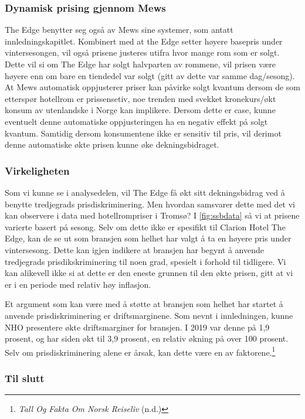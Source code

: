 \documentclass[
  12pt,
  a4paper,
  DIV=11,
  numbers=noendperiod]{scrartcl}
\begin{document}
\subsubsection{Dynamisk prising gjennom
Mews}\label{dynamisk-prising-gjennom-mews}

The Edge benytter seg også av Mews sine systemer, som antatt
innledningskapitlet. Kombinert med at the Edge setter høyere basepris
under vintersesongen, vil også prisene justeres utifra hvor mange rom
som er solgt. Dette vil si om The Edge har solgt halvparten av rommene,
vil prisen være høyere enn om bare en tiendedel var solgt (gitt av dette
var samme dag/sesong). At Mews automatisk oppjusterer priser kan påvirke
solgt kvantum dersom de som etterspør hotellrom er prissensetiv, noe
trenden med svekket kronekurs/økt konsum av utenlandske i Norge kan
implikere. Dersom dette er case, kunne eventuelt denne automatiske
oppjusteringen ha en negativ effekt på solgt kvantum. Samtidig dersom
konsumentene ikke er sensitiv til pris, vil derimot denne automatiske
økte prisen kunne øke dekningsbidraget.

\subsubsection{Virkeligheten}\label{virkeligheten}

Som vi kunne se i analysedelen, vil The Edge få økt sitt dekningsbidrag
ved å benytte tredjegrads prisdiskriminering. Men hvordan samsvarer
dette med det vi kan observere i data med hotellrompriser i Tromsø? I
\autoref{fig:ssbdata} så vi at prisene varierte basert på sesong. Selv
om dette ikke er spesifikt til Clarion Hotel The Edge, kan de se ut som
bransjen som helhet har valgt å ta en høyere pris under vintersesong.
Dette kan igjen indikere at bransjen har begynt å anvende tredjegrads
prisdikskriminering til noen grad, spesielt i forhold til tidligere. Vi
kan alikevell ikke si at dette er den eneste grunnen til den økte
prisen, gitt at vi er i en periode med relativ høy inflasjon.

Et argument som kan være med å støtte at bransjen som helhet har startet
å anvende prisdiskriminering er driftsmarginene. Som nevnt i
innledningen, kunne NHO presentere økte driftsmarginer for bransjen. I
2019 var denne på 1,9 prosent, og har siden økt til 3,9 prosent, en
relativ økning på over 100 prosent. Selv om prisdiskriminering alene er
årsak, kan dette være en av faktorene.\footnote{\emph{Tall Og Fakta Om
  Norsk Reiseliv} (n.d.)}

\subsubsection{Til slutt}\label{til-slutt}
\end{document}
